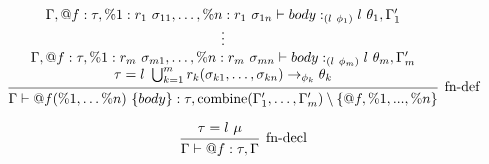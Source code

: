 \documentclass{article}
\begin{document}
\[
\begin{prooftree}
    \hypo{
    \begin{matrix}
        \Gamma, @f : \tau, \%1 : r_1\ \sigma_{11}, \ldots, \%n: r_1\ \sigma_{1n} \vdash body :_{(l\ \phi_1)} l\ \theta_1, \Gamma'_1 \\
        \vdots \\
        \Gamma, @f : \tau, \%1 : r_m\ \sigma_{m1}, \ldots, \%n: r_m\ \sigma_{mn} \vdash body :_{(l\ \phi_m)} l\ \theta_m, \Gamma'_m \\
        \tau = l\ \bigcup_{k=1}^m r_k (\sigma_{k1}, \dots, \sigma_{kn}) \rightarrow_{\phi_k} \theta_k
    \end{matrix}
    }
    \infer1[fn-def]{\Gamma \vdash @f(\%1, \dots \%n)\ \{ body \} : \tau, \text{combine}(\Gamma'_1, \dots, \Gamma'_m) \setminus \{ @f, \%1, ..., \%n \}  }
    
\end{prooftree}
\]

\[
\begin{prooftree}
    \hypo{\tau = l\ \mu}
    \infer1[fn-decl]{\Gamma \vdash @f : \tau, \Gamma}
\end{prooftree}
\]
\end{document}
